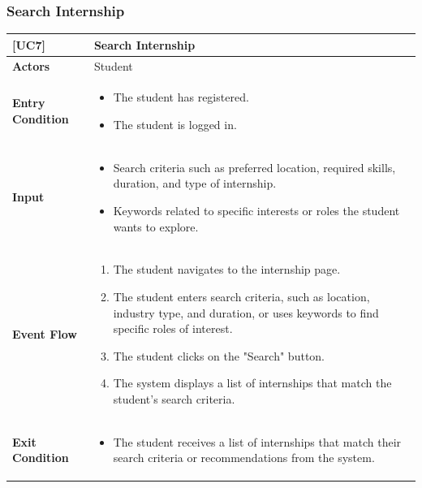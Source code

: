 \subsubsection*{Search Internship}
\begin{table}[H]
    \centering
    \renewcommand{\arraystretch}{1.5}
    \begin{tabular}{|p{4cm}|p{11cm}|}
    \hline
    \rowcolor{bluepoli!40}
    \textbf{[UC7]} & \textbf{Search Internship} \\ \hline \hline
    \textbf{Actors} & Student \\ \hline
    \textbf{Entry Condition} & 
    {\setlength{\leftmargini}{1.1em}
    \begin{itemize}
        \item The student has registered.
        \item The student is logged in.
    \end{itemize}} \\ \hline
    \textbf{Input} & 
    {\setlength{\leftmargini}{1.1em}
    \begin{itemize}
        \item Search criteria such as preferred location, required skills, duration, and type of internship.
        \item Keywords related to specific interests or roles the student wants to explore.
    \end{itemize}} \\ \hline
    \textbf{Event Flow} & 
    {\setlength{\leftmargini}{1.4em}
    \begin{enumerate}
        \item The student navigates to the internship page.
        \item The student enters search criteria, such as location, industry type, and duration, or uses keywords to find specific roles of interest.
        \item The student clicks on the "Search" button.
        \item The system displays a list of internships that match the student's search criteria.
    \end{enumerate}} \\ \hline
    \textbf{Exit Condition} & 
    {\setlength{\leftmargini}{1.1em}
    \begin{itemize}
        \item The student receives a list of internships that match their search criteria or recommendations from the system.
    \end{itemize}} \\ \hline

\end{tabular}
\end{table}
